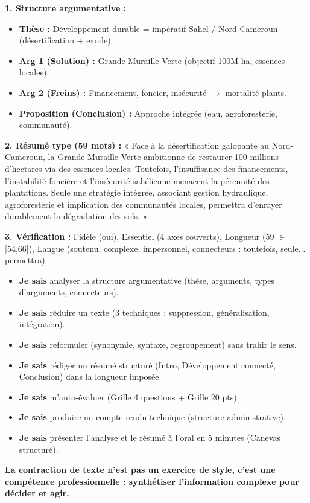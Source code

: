 \documentclass[11pt]{article}
\begin{document}
\begin{corrige}
\textbf{1. Structure argumentative :}
\begin{itemize}
    \item \textbf{Thèse :} Développement durable = impératif Sahel / Nord-Cameroun (désertification + exode).
    \item \textbf{Arg 1 (Solution) :} Grande Muraille Verte (objectif 100M ha, essences locales).
    \item \textbf{Arg 2 (Freins) :} Financement, foncier, insécurité $\rightarrow$ mortalité plants.
    \item \textbf{Proposition (Conclusion) :} Approche intégrée (eau, agroforesterie, communauté).
\end{itemize}

\textbf{2. Résumé type (59 mots) :}
« Face à la désertification galopante au Nord-Cameroun, la Grande Muraille Verte ambitionne de restaurer 100 millions d'hectares via des essences locales. Toutefois, l'insuffisance des financements, l'instabilité foncière et l'insécurité sahélienne menacent la pérennité des plantations. Seule une stratégie intégrée, associant gestion hydraulique, agroforesterie et implication des communautés locales, permettra d'enrayer durablement la dégradation des sols. »

\textbf{3. Vérification :} Fidèle (oui), Essentiel (4 axes couverts), Longueur (59 $\in$ [54,66]), Langue (soutenu, complexe, impersonnel, connecteurs : toutefois, seule... permettra).
\end{corrige}

\begin{aretenir}
\begin{itemize}
    \item \textbf{Je sais} analyser la structure argumentative (thèse, arguments, types d'arguments, connecteurs).
    \item \textbf{Je sais} réduire un texte (3 techniques : suppression, généralisation, intégration).
    \item \textbf{Je sais} reformuler (synonymie, syntaxe, regroupement) sans trahir le sens.
    \item \textbf{Je sais} rédiger un résumé structuré (Intro, Développement connecté, Conclusion) dans la longueur imposée.
    \item \textbf{Je sais} m'auto-évaluer (Grille 4 questions + Grille 20 pts).
    \item \textbf{Je sais} produire un compte-rendu technique (structure administrative).
    \item \textbf{Je sais} présenter l'analyse et le résumé à l'oral en 5 minutes (Canevas structuré).
\end{itemize}
\textbf{La contraction de texte n'est pas un exercice de style, c'est une compétence professionnelle : synthétiser l'information complexe pour décider et agir.}
\end{aretenir}
\end{document}
